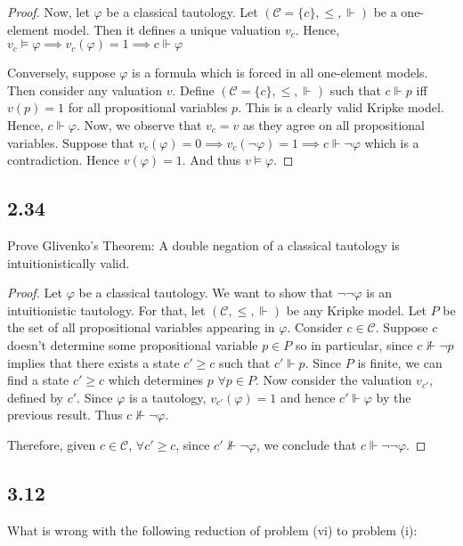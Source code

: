 \documentclass[12pt]{article}
\begin{document}
\begin{proof}
Now, let $\varphi$ be a classical tautology. Let $(\mathcal{C} = \{c\}, \leq, \Vdash)$ be a one-element model. Then it defines a unique valuation $v_c$. Hence, $v_c \vDash \varphi \implies v_c(\varphi) = 1 \implies c \Vdash \varphi$

Conversely, suppose $\varphi$ is a formula which is forced in all one-element models. Then consider any valuation $v$. Define $(\mathcal{C} = \{c\}, \leq, \Vdash)$ such that $c \Vdash p$ iff $v(p) = 1$ for all propositional variables $p$. This is a clearly valid Kripke model. Hence, $c \Vdash \varphi$. Now, we observe that $v_c = v$ as they agree on all propositional variables. Suppose that $v_c(\varphi) = 0 \implies v_c(\neg \varphi) = 1 \implies c \Vdash \neg \varphi$ which is a contradiction. Hence $v(\varphi) = 1$. And thus $v \vDash \varphi$.
\end{proof}

\subsection*{2.34}
Prove Glivenko's Theorem: A double negation of a classical tautology is intuitionistically valid. \\

\begin{proof}
Let $\varphi$ be a classical tautology. We want to show that $\neg \neg \varphi$ is an intuitionistic tautology. For that, let $(\mathcal{C}, \leq, \Vdash)$ be any Kripke model. Let $P$ be the set of all propositional variables appearing in $\varphi$. Consider $c \in \mathcal{C}$. Suppose $c$ doesn't determine some propositional variable $p \in P$ so in particular, since $c \not \Vdash \neg p$ implies that there exists a state $c' \geq c$ such that $c' \Vdash p$. Since $P$ is finite, we can find a state $c' \geq c$ which determines $p$ $\forall p \in P$. Now consider the valuation $v_{c'}$, defined by $c'$. Since $\varphi$ is a tautology, $v_{c'}(\varphi) = 1$ and hence $c' \Vdash \varphi$ by the previous result. Thus $c \not \Vdash \neg \varphi$. 

Therefore, given $c \in \mathcal{C}$, $\forall c' \geq c$, since $c' \not \Vdash \neg \varphi$, we conclude that $c \Vdash \neg \neg \varphi$.
\end{proof}

\subsection*{3.12}
What is wrong with the following reduction of problem (vi) to problem (i):
\end{document}

